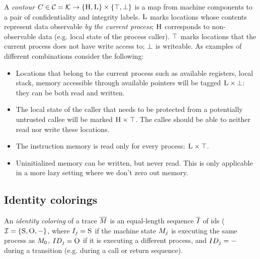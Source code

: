 \documentclass[conference]{IEEEtran}
\begin{document}
A {\em contour} $C \in {\mathcal C} = {\mathcal K} \rightarrow
\{\textsc{H}, \textsc{L}\} \times \{\top, \bot\}$ is a map from
machine components to a pair of confidentiality and integrity labels.
$\textsc{L}$ marks locations whose contents represent data observable
{\em by the current process}; $\textsc{H}$ corresponds to non-observable
data (e.g. local state of the process caller). $\top$ marks
locations that the current process does not have write access to;
$\bot$ is writeable. As examples of different
combinations consider the following:
\begin{itemize}
\item Locations that belong to the current process such as
  available registers, local stack, memory accessible through
  available pointers will be tagged $\textsc{L} \times \bot$:
  they can be both read and written.
\item The local state of the caller that needs to be protected from a
  potentially untrusted callee will be marked $\textsc{H} \times
  \top$. The callee should be able to neither read nor write
  these locations.
\item The instruction memory is read only for every process: $\textsc{L}
  \times \top$.
\item Uninitialized memory can be written, but never read. This is only
  applicable in a more lazy setting where we don't zero out memory.
\end{itemize}

\subsection{Identity colorings}

An {\em identity coloring} of a trace $\overline{M}$ is an equal-length
sequence $\overline{I}$ of ids (${\mathcal{I}} = \{\textsc{S}, \textsc{O}, -\}$, where
$I_j = \textsc{S}$ if the machine state $M_j$ is executing the same
process as $M_0$, $ID_j = \textsc{O}$ if it is executing a different
process, and $ID_j = -$ during a transition (e.g. during a call
or return sequence).
\end{document}

